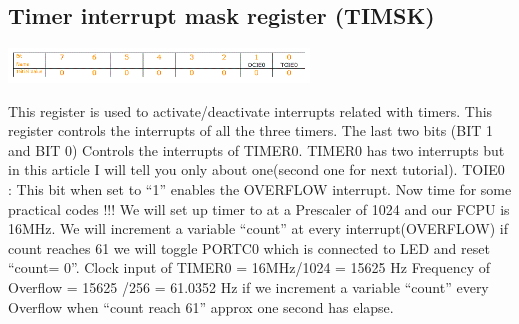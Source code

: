\subsection{Timer interrupt mask register (TIMSK)}
\centerline{
	\includegraphics[width=0.6\textwidth]{overview/images/timer6.png}
}

This register is used to activate/deactivate interrupts related with timers. This register controls the interrupts of all the three timers. The last two bits (BIT 1 and BIT 0) Controls the interrupts of TIMER0. TIMER0 has two interrupts but in this article I will tell you only about one(second one for next tutorial). TOIE0 : This bit when set to “1” enables the OVERFLOW interrupt. Now time for some practical codes !!! We will set up timer to at a Prescaler of 1024 and our FCPU is 16MHz. We will increment a variable “count” at every interrupt(OVERFLOW) if count reaches 61 we will toggle PORTC0 which is connected to LED and reset “count= 0”. Clock input of TIMER0 = 16MHz/1024 = 15625 Hz Frequency of Overflow = 15625 /256 = 61.0352 Hz if we increment a variable “count” every Overflow when “count reach 61” approx one second has elapse.

